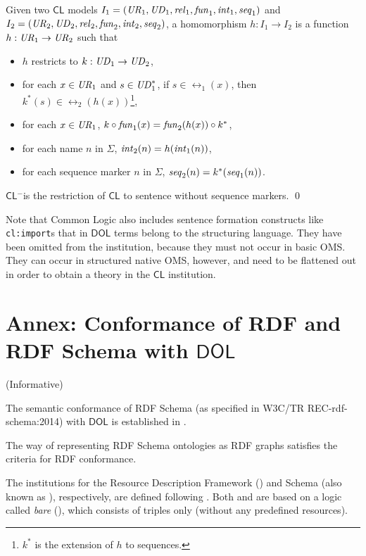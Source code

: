 \documentclass[10pt,fleqn,final]{scrreprt}
\newcommand{\cbs}[0]{\color{red}\xspace} %
\newcommand{\cbe}[0]{\color{black}\xspace} %
\newcommand*{\CL}{\ensuremath{\mathsf{CL}}\xspace}
\newcommand*{\DOL}{\ensuremath{\mathsf{DOL}}\xspace}
\newcommand{\CLminus}{\CL$^-$}
\newcommand{\informative}[0]{{\begin{center}{\Large{(Informative})}\end{center}} \bigskip}
\newcommand{\nisref}[1]{#1}
\newcommand{\infannex}[1]{ \chapter{Annex: #1}  \informative }
\newenvironment{definitions}[0]{\medskip }{}
\begin{document}
\begin{definitions}
\begin{definition}
Given two \CL models $I_1=(\mathit{UR}_1,\mathit{UD}_1,\mathit{rel}_1,\mathit{fun}_1,\mathit{int}_1,\mathit{seq}_1)$
and  $I_2=(\mathit{UR}_2,\mathit{UD}_2,\mathit{rel}_2,\mathit{fun}_2,\mathit{int}_2,\mathit{seq}_2)$, a homomorphism
$h:I_1\to I_2$ is a function $h:\mathit{UR}_1\to\mathit{UR}_2$ such that
\begin{itemize}
\item $h$ restricts to $k:\mathit{UD}_1\to\mathit{UD}_2$,
\item for each $x\in\mathit{UR}_1$ and $s\in\mathit{UD}_1^*$, if $s\in\rel_1(x)$, then $k^*(s)\in\rel_2(h(x))$\footnote{$k^*$ is the extension of $h$ to sequences.},
\item for each $x\in\mathit{UR}_1$, $k\circ\mathit{fun}_1(x)=\mathit{fun}_2(h(x))\circ k^*$,
\item for each name $n$ in $\Sigma$, $\mathit{int}_2(n)=h(\mathit{int}_1(n))$,
\item for each sequence marker $n$ in $\Sigma$, $\mathit{seq}_2(n)=k^*(\mathit{seq}_1(n))$.
\end{itemize}

\cbs  \CLminus is the restriction of \CL to sentence\cbe
without sequence markers.
\qed\end{definition}

Note that Common Logic also includes sentence formation constructs like
\texttt{cl:import}s that in \DOL terms belong to the structuring
language. They have been omitted from the institution, because
they must not occur in basic OMS. They can occur in
structured native OMS, however, and need to be flattened out
in order to obtain a theory in the \CL institution.
 
\infannex{Conformance of RDF and RDF Schema with \DOL}\label{a:rdfs}

The semantic conformance of RDF Schema (as specified in \nisref{W3C/TR REC-rdf-schema:2014}) with \DOL is established in \cite{OntoGraph}.

The way of representing RDF Schema ontologies as RDF graphs satisfies the criteria for RDF conformance.


\begin{definition}
\cbs  
The institutions for the Resource Description
Framework (\RDF) and \RDF Schema (also known as \RDFS), respectively, are defined following \cite{Lucanu}. Both \RDF and \RDFS 
\cbe are based on a logic called \emph{bare} \RDF (\SimpleRDF), which consists
of triples only (without any predefined resources).


\end{definition}
\end{definitions}
\end{document}
